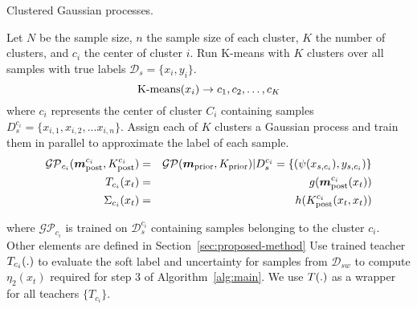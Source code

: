 \begin{algorithm}[t!]
\caption{Clustered Gaussian processes.}%
\begin{algorithmic}[1]
\State Let $N$ be the sample size, $n$ the sample size of each cluster, $K$ the number of clusters, and $c_i$ the center of cluster $i$.
\medskip
\State Run K-means with $K$ clusters over all samples with true labels $\mathcal{D}_s=\{x_i,y_i\}$.
\begin{equation*}
    {\rm K\mbox{-}means}({x_i}) \rightarrow {c_1, c_2, \ldots, c_K}
\end{equation*}
where $c_i$ represents the center of cluster $C_i$ containing samples $D_s^{c_i}=\{x_{i,1}, x_{i,2}, ... x_{i,n}\}$.
\medskip
\State Assign each of $K$ clusters a Gaussian process and train them in parallel to approximate the label of each sample.
\begin{eqnarray*}
\mathcal{GP}_{c_i}(\bm{m}_{\rm post}^{c_i}, K_{\rm post}^{c_i})&=&\mathcal{GP}(\bm{m}_{\rm prior}, K_{\rm prior}) | D_s^{c_i}=\{(\psi(x_{s,c_i}),y_{s,c_i})\}\\
T_{c_i}(x_t) &=& g(\bm{m}_{\rm post}^{c_i}(x_t))\\
\Sigma_{c_i}(x_t) &=& h(K_{\rm post}^{c_i}(x_t,x_t))
\end{eqnarray*}




where $\mathcal{GP}_{c_i}$ is trained on $\mathcal{D}_s^{c_i}$ containing samples belonging to the cluster $c_i$. Other elements are defined in Section~\ref{sec:proposed-method}
\medskip
\State Use trained teacher $T_{c_i}(.)$ to evaluate the soft label and uncertainty for samples from $\mathcal{D}_{sw}$ to compute $\eta_2(x_t)$ required for step 3 of Algorithm~\ref{alg:main}. We use $T(.)$ as a wrapper for all teachers $\{T_{c_i}\}$.
\end{algorithmic}
\label{alg:CGP}
\end{algorithm}
\shrink
